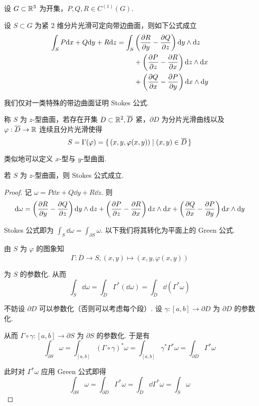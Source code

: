
\begin{theorem}[Stokes 公式]
    设 $G\subset\mathbb{R}^3$ 为开集，$P,Q,R\in C^{(1)}(G)$.
    
    设 $S\subset G$ 为紧 $2$ 维分片光滑可定向带边曲面，则如下公式成立
$$
\begin{aligned}
    \int_SP\mathrm{d} x+Q\mathrm{d} y+R\mathrm{d} z=\int_S&\left(\frac{\partial{R}}{\partial{y}}-\frac{\partial{Q}}{\partial{z}}\right)\mathrm{d} y\wedge\mathrm{d} z\\
    &+\left(\frac{\partial{P}}{\partial{z}}-\frac{\partial{R}}{\partial{x}}\right)\mathrm{d} z\wedge\mathrm{d} x\\
    &+\left(\frac{\partial{Q}}{\partial{x}}-\frac{\partial{P}}{\partial{y}}\right)\mathrm{d} x\wedge\mathrm{d} y
\end{aligned}
$$
\end{theorem}

我们仅对一类特殊的带边曲面证明 Stokes 公式.

\begin{definition}
    称 $S$ 为 $z$-型曲面，若存在开集 $D\subset\mathbb{R}^2,\overline{D}$ 紧，$\partial D$ 为分片光滑曲线以及 $\varphi:\overline{D}\to\mathbb{R}$ 连续且分片光滑使得
$$
S=\Gamma(\varphi)=\set{(x,y,\varphi(x,y))|(x,y)\in\overline{D}}
$$
\end{definition}


类似地可以定义 $x$-型与 $y$-型曲面.

\begin{lemma}
    若 $S$ 为 $z$-型曲面，则 Stokes 公式成立.
\end{lemma}
\begin{proof}
    记 $\omega=P\dd x+Q\dd y+R\dd z$. 则
$$
\mathrm{d}\omega=\left(\frac{\partial{R}}{\partial{y}}-\frac{\partial{Q}}{\partial{z}}\right)\mathrm{d} y\wedge\mathrm{d} z+\left(\frac{\partial{P}}{\partial{z}}-\frac{\partial{R}}{\partial{x}}\right)\mathrm{d} z\wedge\mathrm{d} x+\left(\frac{\partial{Q}}{\partial{x}}-\frac{\partial{P}}{\partial{y}}\right)\mathrm{d} x\wedge\mathrm{d} y
$$

    Stokes 公式即为 $\displaystyle\int_S\dd\omega=\int_{\partial S}\omega$. 以下我们将其转化为平面上的 Green 公式.
    
    由 $S$ 为 $\varphi$ 的图象知
$$
\Gamma:\overline{D}\to S,(x,y)\mapsto(x,y,\varphi(x,y))
$$

    为 $S$ 的参数化. 从而
$$
\int_S\dd\omega=\int_{\overline{D}}\Gamma^*(\dd\omega)=\int_{\overline{D}}\dd(\Gamma^*\omega)
$$

    不妨设 $\partial D$ 可以参数化（否则可以考虑每个段）. 设 $\gamma:[a,b]\to\partial D$ 为 $\partial D$ 的参数化.

    从而 $\Gamma\circ\gamma:[a,b]\to\partial S$ 为 $\partial S$ 的参数化. 于是有
$$
\int_{\partial S}\omega=\int_{[a,b]}(\Gamma\circ\gamma)^*\omega=\int_{[a,b]}\gamma^*\Gamma^*\omega=\int_{\partial D}\Gamma^*\omega
$$

    此时对 $\Gamma^*\omega$ 应用 Green 公式即得
$$
\int_{\partial S}\omega=\int_{\partial D}\Gamma^*\omega=\int_D\dd\Gamma^*\omega=\int_S\omega
$$
\end{proof}

